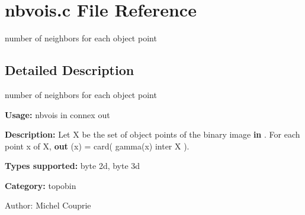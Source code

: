 \section{nbvois.c File Reference}
\label{nbvois_8c}
number of neighbors for each object point  




\label{_details}
\subsection{Detailed Description}
number of neighbors for each object point 

{\bf Usage:} nbvois in connex out

{\bf Description:} Let X be the set of object points of the binary image {\bf in} . For each point x of X, {\bf out} (x) = card( gamma(x) inter X ).

{\bf Types supported:} byte 2d, byte 3d

{\bf Category:} topobin

\begin{Desc}
\item[Author:]Michel Couprie \end{Desc}
